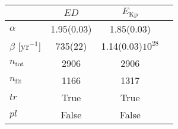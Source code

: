 \begin{tabular}{lccr}
\hline
  &        $ED$ &      $E_\mathrm{Kp}$ \\
\hline
$\alpha$            &  1.95(0.03) &           1.85(0.03) \\
$\beta$ [yr$^{-1}$] &     735(22) &  1.14(0.03)$10^{28}$ \\
$n_\mathrm{tot}$    &        2906 &                 2906 \\
$n_\mathrm{fit}$    &        1166 &                 1317 \\
$tr$                &        True &                 True \\
$pl$                &       False &                False \\
\hline

\end{tabular}
